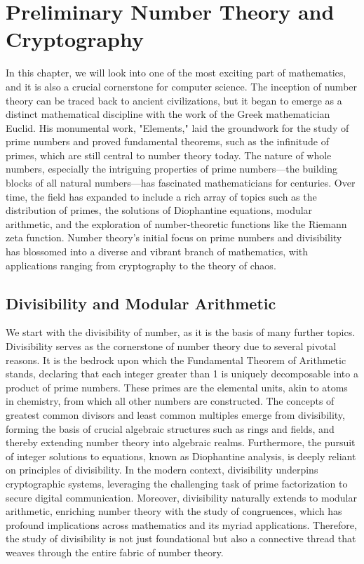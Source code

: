 \chapterspaceabove{6.75cm} 
\chapterspacebelow{7.25cm} 
\chapter{Preliminary Number Theory and Cryptography}
In this chapter, we will look into one of the most exciting part of mathematics, and it is also a
crucial cornerstone for computer science. The inception of number theory can be traced back to ancient civilizations, but it began to emerge as a distinct mathematical discipline with the work of the Greek mathematician Euclid. His monumental work, "Elements," laid the groundwork for the study of prime numbers and proved fundamental theorems, such as the infinitude of primes, which are still central to number theory today. The nature of whole numbers, especially the intriguing properties of prime numbers—the building blocks of all natural numbers—has fascinated mathematicians for centuries. Over time, the field has expanded to include a rich array of topics such as the distribution of primes, the solutions of Diophantine equations, modular arithmetic, and the exploration of number-theoretic functions like the Riemann zeta function. Number theory's initial focus on prime numbers and divisibility has blossomed into a diverse and vibrant branch of mathematics, with applications ranging from cryptography to the theory of chaos.

\section{Divisibility and Modular Arithmetic}
We start with the divisibility of number, as it is the basis of many further topics.
Divisibility serves as the cornerstone of number theory due to several pivotal reasons. It is the bedrock upon which the Fundamental Theorem of Arithmetic stands, declaring that each integer greater than 1 is uniquely decomposable into a product of prime numbers. These primes are the elemental units, akin to atoms in chemistry, from which all other numbers are constructed. The concepts of greatest common divisors and least common multiples emerge from divisibility, forming the basis of crucial algebraic structures such as rings and fields, and thereby extending number theory into algebraic realms. Furthermore, the pursuit of integer solutions to equations, known as Diophantine analysis, is deeply reliant on principles of divisibility. In the modern context, divisibility underpins cryptographic systems, leveraging the challenging task of prime factorization to secure digital communication. Moreover, divisibility naturally extends to modular arithmetic, enriching number theory with the study of congruences, which has profound implications across mathematics and its myriad applications. Therefore, the study of divisibility is not just foundational but also a connective thread that weaves through the entire fabric of number theory.

